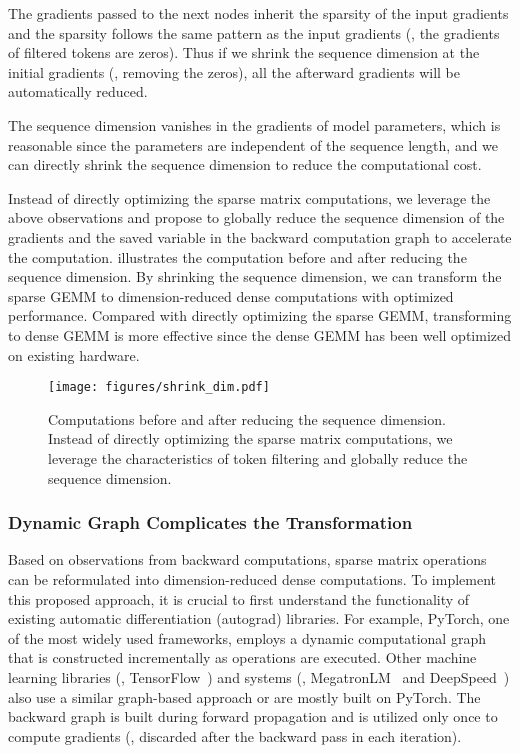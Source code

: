 \begin{icompact}
\item The gradients passed to the next nodes inherit the sparsity of the input gradients and the sparsity follows the same pattern as the input gradients (\ie, the gradients of filtered tokens are zeros). Thus if we shrink the sequence dimension at the initial gradients (\ie, removing the zeros), all the afterward gradients will be automatically reduced.
\item The sequence dimension vanishes in the gradients of model parameters, which is reasonable since the parameters are independent of the sequence length, and we can directly shrink the sequence dimension to reduce the computational cost.
\end{icompact}

Instead of directly optimizing the sparse matrix computations, we leverage the above observations and propose to globally reduce the sequence dimension of the gradients and the saved variable in the backward computation graph to accelerate the computation.  illustrates the computation before and after reducing the sequence dimension. By shrinking the sequence dimension, we can transform the sparse GEMM to dimension-reduced dense computations with optimized performance. Compared with directly optimizing the sparse GEMM, transforming to dense GEMM is more effective since the dense GEMM has been well optimized on existing hardware.

\begin{figure}[h!]
	\centering
	\texttt{[image: figures/shrink\_dim.pdf]}
	\caption{Computations before and after reducing the sequence dimension. Instead of directly optimizing the sparse matrix computations, we leverage the characteristics of token filtering and globally reduce the sequence dimension.} 
	\label{fig:shrink_dim}
\end{figure}

\subsubsection{Dynamic Graph Complicates the Transformation} \label{sec:system:challenges_of_updating_graph}

Based on observations from backward computations, sparse matrix operations can be reformulated into dimension-reduced dense computations. To implement this proposed approach, it is crucial to first understand the functionality of existing automatic differentiation (autograd) libraries. For example, PyTorch, one of the most widely used frameworks, employs a dynamic computational graph that is constructed incrementally as operations are executed.
Other machine learning libraries (\eg, TensorFlow~\cite{TensorFlow}) and systems (\eg, MegatronLM~\cite{MegatronLM} and DeepSpeed~\cite{deepspeed}) also use a similar graph-based approach or are mostly built on PyTorch.
The backward graph is built during forward propagation and is utilized only once to compute gradients (\ie, discarded after the backward pass in each iteration).

